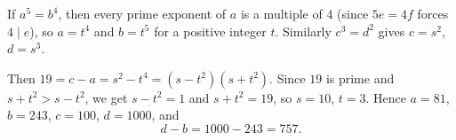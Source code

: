 If $a^5=b^4$, then every prime exponent of $a$ is a multiple of $4$ (since $5e=4f$ forces $4\mid e$), so $a=t^4$ and $b=t^5$ for a positive integer $t$. Similarly $c^3=d^2$ gives $c=s^2$, $d=s^3$.

Then $19=c-a=s^2-t^4=(s-t^2)(s+t^2)$. Since $19$ is prime and $s+t^2>s-t^2$, we get $s-t^2=1$ and $s+t^2=19$, so $s=10$, $t=3$. Hence $a=81$, $b=243$, $c=100$, $d=1000$, and
\[
d-b=1000-243=\boxed{757}.
\]

